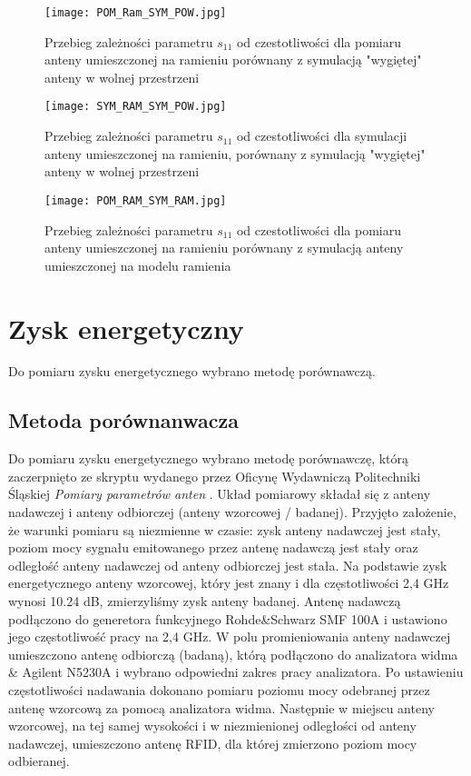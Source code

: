 \newpage
\begin{figure}[H]
\centering 
	\texttt{[image: POM\_Ram\_SYM\_POW.jpg]}
	\caption{Przebieg zależności parametru $s_{11}$ od czestotliwości dla pomiaru anteny umieszczonej na ramieniu porównany z symulacją "wygiętej" anteny w wolnej przestrzeni}
\end{figure}

\newpage
\begin{figure}[H]
\centering
	\texttt{[image: SYM\_RAM\_SYM\_POW.jpg]}
	\caption{Przebieg zależności parametru $s_{11}$ od czestotliwości dla symulacji anteny umieszczonej na ramieniu, porównany z symulacją "wygiętej" anteny w wolnej przestrzeni}
\end{figure}


\newpage
\begin{figure}[H]
\centering
	\texttt{[image: POM\_RAM\_SYM\_RAM.jpg]}
	\caption{Przebieg zależności parametru $s_{11}$ od czestotliwości dla pomiaru anteny umieszczonej na ramieniu porównany z symulacją anteny umieszczonej na modelu ramienia}
\end{figure}





\newpage
\section{Zysk energetyczny}

Do pomiaru zysku energetycznego wybrano metodę porównawczą.

\subsection {Metoda porównanwacza}

Do pomiaru zysku energetycznego wybrano metodę porównawczę, którą zaczerpnięto ze skryptu wydanego przez Oficynę Wydawniczą Politechniki Śląskiej \emph{Pomiary parametrów anten} \cite{Pomiary_parametrów}. Układ pomiarowy składał się z anteny nadawczej  i anteny odbiorczej (anteny wzorcowej / badanej). Przyjęto założenie, że warunki pomiaru są niezmienne w czasie: zysk anteny nadawczej jest stały, poziom mocy sygnału emitowanego przez antenę nadawczą jest stały oraz odległość anteny nadawczej od anteny odbiorczej jest stała. Na podstawie zysk energetycznego anteny wzorcowej, który jest znany i dla częstotliwości 2,4 GHz wynosi 10.24 dB, zmierzyliśmy zysk anteny badanej. Antenę nadawczą podłączono do generetora funkcyjnego 
Rohde\&Schwarz SMF 100A i ustawiono jego częstotliwość pracy na 2,4 GHz. W polu promieniowania anteny nadawczej umieszczono antenę odbiorczą (badaną), którą podłączono do analizatora widma \& Agilent N5230A i wybrano odpowiedni zakres pracy analizatora. Po ustawieniu częstotliwości nadawania dokonano pomiaru poziomu mocy odebranej przez antenę wzorcową za pomocą analizatora widma. Następnie w miejscu anteny wzorcowej, na tej samej wysokości i w niezmienionej odległości od anteny nadawczej, umieszczono antenę RFID, dla której zmierzono poziom mocy odbieranej. 


